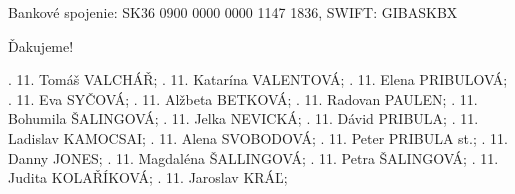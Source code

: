 Bankové spojenie: SK36 0900 0000 0000 1147 1836, SWIFT: GIBASKBX

Ďakujeme!


.	11.	Tomáš	VALCHÁŘ;
.	11.	Katarína	VALENTOVÁ;
.	11.	Elena	PRIBULOVÁ;
.	11.	Eva	SYČOVÁ;
.	11.	Alžbeta	BETKOVÁ;
.	11.	Radovan	PAULEN;
.	11.	Bohumila	ŠALINGOVÁ;
.	11.	Jelka	NEVICKÁ;
.	11.	Dávid	PRIBULA;
.	11.	Ladislav	KAMOCSAI;
.	11.	Alena	SVOBODOVÁ;
.	11.	Peter	PRIBULA st.;
.  11. Danny	JONES;
.	11.	Magdaléna	ŠALLINGOVÁ;
.	11.	Petra	ŠALINGOVÁ;
.	11.	Judita	KOLAŘÍKOVÁ;
.	11.	Jaroslav	KRÁĽ;
\narodeniny




\tiraz
\bye
